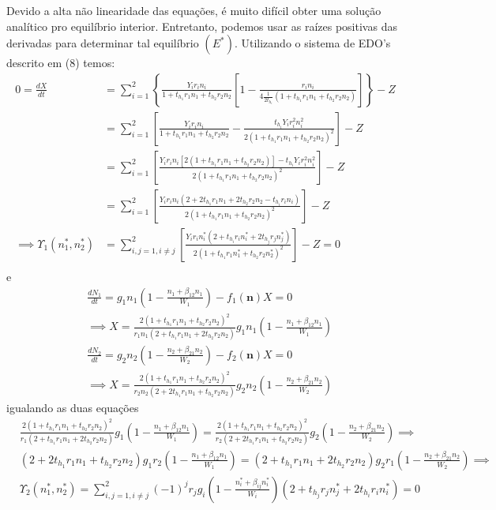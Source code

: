 \documentclass{article}
\begin{document}
Devido a alta não linearidade das equações, é muito difícil obter uma solução analítico pro equilíbrio interior. Entretanto, podemos usar as raízes positivas das derivadas para determinar tal equilíbrio $(E^*)$. Utilizando o sistema de EDO's descrito em (8) temos:
\begin{align*}
    0=\frac{dX}{dt}&=\sum_{i=1}^2\left\{\frac{Y_ir_in_i}{1+t_{h_1}r_1n_1+t_{h_2}r_2n_2}\left[1-\frac{r_in_i}{4\frac{1}{2t_{h_i}}(1+t_{h_1}r_1n_1+t_{h_2}r_2n_2)}\right]\right\} - Z \\
    &=\sum_{i=1}^2\left[\frac{Y_ir_in_i}{1+t_{h_1}r_1n_1+t_{h_2}r_2n_2}-\frac{t_{h_i}Y_ir_i^2n_i^2}{2(1+t_{h_1}r_1n_1+t_{h_2}r_2n_2)^2}\right] - Z\\
    &=\sum_{i=1}^2\left[\frac{Y_ir_in_i[2(1+t_{h_1}r_1n_1+t_{h_2}r_2n_2)] - t_{h_i}Y_ir_i^2n_i^2}{2(1+t_{h_1}r_1n_1+t_{h_2}r_2n_2)^2}\right] - Z\\
    &=\sum_{i=1}^2\left[\frac{Y_ir_in_i(2+2t_{h_1}r_1n_1+2t_{h_2}r_2n_2-t_{h_i}r_in_i) }{2(1+t_{h_1}r_1n_1+t_{h_2}r_2n_2)^2}\right] - Z\\
    \implies \Upsilon_1(n_1^*,n_2^*)&=\sum_{i,j=1,i\neq j}^2\left[\frac{Y_ir_in_i^*(2+t_{h_i}r_in_i^*+2t_{h_j}r_jn_j^*) }{2(1+t_{h_1}r_1n_1^*+t_{h_2}r_2n_2^*)^2}\right] - Z=0\\
\end{align*}
e
\begin{align*}
    &\frac{dN_1}{dt}=g_1n_1\left(1-\frac{n_1+\beta_{12}n_1}{W_1}\right)-f_1(\textbf{n})X=0\\&\implies X=\frac{2(1+t_{h_1}r_1n_1+t_{h_2}r_2n_2)^2}{r_1n_1(2+t_{h_1}r_1n_1+2t_{h_2}r_2n_2)}g_1n_1\left(1-\frac{n_1+\beta_{12}n_1}{W_1}\right)\\
    &\frac{dN_2}{dt}=g_2n_2\left(1-\frac{n_2+\beta_{21}n_2}{W_2}\right)-f_2(\textbf{n})X = 0\\& \implies X=\frac{2(1+t_{h_1}r_1n_1+t_{h_2}r_2n_2)^2}{r_2n_2(2+2t_{h_1}r_1n_1+t_{h_2}r_2n_2)}g_2n_2\left(1-\frac{n_2+\beta_{21}n_2}{W_2}\right)
\end{align*}
igualando as duas equações
\begin{align*}
    &\frac{2(1+t_{h_1}r_1n_1+t_{h_2}r_2n_2)^2}{r_1(2+t_{h_1}r_1n_1+2t_{h_2}r_2n_2)}g_1\left(1-\frac{n_1+\beta_{12}n_1}{W_1}\right)=\frac{2(1+t_{h_1}r_1n_1+t_{h_2}r_2n_2)^2}{r_2(2+2t_{h_1}r_1n_1+t_{h_2}r_2n_2)}g_2\left(1-\frac{n_2+\beta_{21}n_2}{W_2}\right) \implies \\
    &(2+2t_{h_1}r_1n_1+t_{h_2}r_2n_2)g_1r_2\left(1-\frac{n_1+\beta_{12}n_1}{W_1}\right)=(2+t_{h_1}r_1n_1+2t_{h_2}r_2n_2)g_2r_1\left(1-\frac{n_2+\beta_{21}n_2}{W_2}\right) \implies\\
    &\Upsilon_2(n_1^*,n_2^*)= \sum_{i,j=1,i\neq j}^2 (-1)^j r_jg_i\left(1-\frac{n_i^*+\beta_{ij}n_i^*}{W_i}\right)(2+t_{h_j}r_jn_j^*+2t_{h_i}r_in_i^*) =0
\end{align*}
\end{document}
